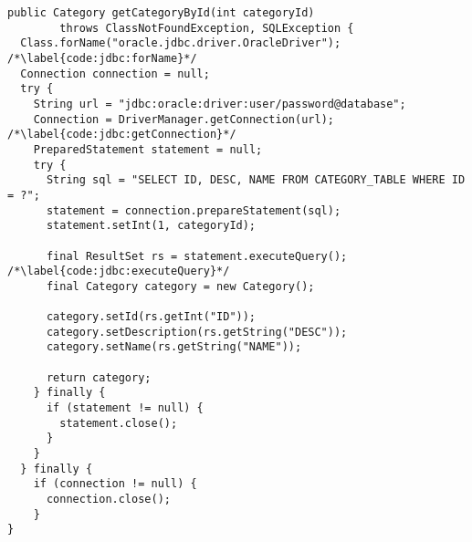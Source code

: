 
\begin{lstlisting}[caption={Príklad použitia JDBC}, label={code:jdbc}]
public Category getCategoryById(int categoryId)
        throws ClassNotFoundException, SQLException {
  Class.forName("oracle.jdbc.driver.OracleDriver"); /*\label{code:jdbc:forName}*/
  Connection connection = null;
  try {
    String url = "jdbc:oracle:driver:user/password@database";
    Connection = DriverManager.getConnection(url); /*\label{code:jdbc:getConnection}*/
    PreparedStatement statement = null;
    try {
      String sql = "SELECT ID, DESC, NAME FROM CATEGORY_TABLE WHERE ID = ?";
      statement = connection.prepareStatement(sql);
      statement.setInt(1, categoryId);

      final ResultSet rs = statement.executeQuery(); /*\label{code:jdbc:executeQuery}*/
      final Category category = new Category();

      category.setId(rs.getInt("ID"));
      category.setDescription(rs.getString("DESC"));
      category.setName(rs.getString("NAME"));

      return category;
    } finally {
      if (statement != null) {
        statement.close();
      }
    }
  } finally {
    if (connection != null) {
      connection.close();
    }
}
\end{lstlisting}
